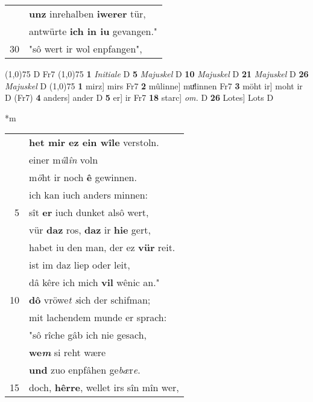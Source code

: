 \documentclass[8pt,a4paper,notitlepage]{article}
\begin{document}
\begin{table}[ht]
\begin{minipage}[t]{0.5\linewidth}
\begin{tabular}{rl}
 & \textbf{unz} inrehalben \textbf{iwerer} tür,\\ 
 & antwürte \textbf{ich in iu} gevangen."\\ 
30 & "sô wert ir wol enpfangen",\\ 
\end{tabular}
\scriptsize
\line(1,0){75} \newline
D Fr7 \newline
\line(1,0){75} \newline
\textbf{1} \textit{Initiale} D  \textbf{5} \textit{Majuskel} D  \textbf{10} \textit{Majuskel} D  \textbf{21} \textit{Majuskel} D  \textbf{26} \textit{Majuskel} D  \newline
\line(1,0){75} \newline
\textbf{1} mirz] mirs Fr7 \textbf{2} mûlinne] muͤlinnen Fr7 \textbf{3} möht ir] moht ir D (Fr7) \textbf{4} anders] ander D \textbf{5} er] ir Fr7 \textbf{18} starc] \textit{om.} D \textbf{26} Lotes] Lots D \newline
\end{minipage}
\hspace{0.5cm}
\begin{minipage}[t]{0.5\linewidth}
\small
\begin{center}*m
\end{center}
\begin{tabular}{rl}
 & \textbf{het mir ez ein wîle} verstoln.\\ 
 & einer m\textit{û}l\textit{în} voln\\ 
 & m\textit{ö}ht ir noch \textbf{ê} gewinnen.\\ 
 & ich kan iuch anders minnen:\\ 
5 & sît \textbf{er} iuch dunket alsô wert,\\ 
 & vür \textbf{daz} ros, \textbf{daz} ir \textbf{hie} gert,\\ 
 & habet iu den man, der ez \textbf{vür} reit.\\ 
 & ist im daz liep oder leit,\\ 
 & dâ kêre ich mich \textbf{vil} wênic an."\\ 
10 & \textbf{dô} vröwe\textit{t} \textit{s}ich der schifman;\\ 
 & mit lachendem munde er sprach:\\ 
 & "sô rîche gâb ich nie gesach,\\ 
 & \textbf{we\textit{m}} si reht wære\\ 
 & \textbf{und} zuo enpfâhen ge\textit{bæ}r\textit{e}.\\ 
15 & doch, \textbf{hêrre}, wellet irs sîn mîn wer,\\ 

\end{tabular}
\end{minipage}
\end{table}
\end{document}
